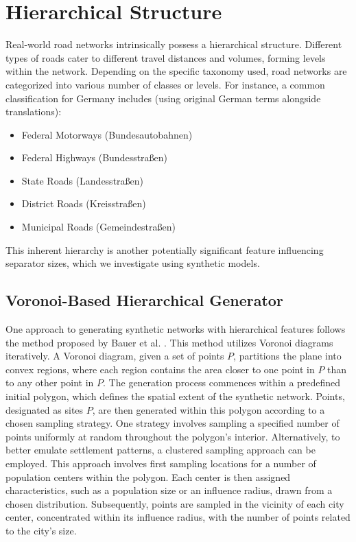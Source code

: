 










\section{Hierarchical Structure}

Real-world road networks intrinsically possess a hierarchical structure.
Different types of roads cater to different travel distances and volumes, forming levels within the network.
Depending on the specific taxonomy used, road networks are categorized into various number of classes or levels.
For instance, a common classification for Germany includes (using original German terms alongside translations):

\begin{itemize}
	\item Federal Motorways (Bundesautobahnen)
	\item Federal Highways (Bundesstraßen)
	\item State Roads (Landesstraßen)
	\item District Roads (Kreisstraßen)
	\item Municipal Roads (Gemeindestraßen)
\end{itemize}

This inherent hierarchy is another potentially significant feature influencing separator sizes, which we investigate using synthetic models.

\subsection{Voronoi-Based Hierarchical Generator}

One approach to generating synthetic networks with hierarchical features follows the method proposed by Bauer et al. \cite{hutchison_synthetic_2010}.
This method utilizes Voronoi diagrams iteratively.
A Voronoi diagram, given a set of points \(P\), partitions the plane into convex regions, where each region contains the area closer to one point in \(P\) than to any other point in \(P\).
The generation process commences within a predefined initial polygon, which defines the spatial extent of the synthetic network.
Points, designated as sites \(P\), are then generated within this polygon according to a chosen sampling strategy.
One strategy involves sampling a specified number of points uniformly at random throughout the polygon's interior.
Alternatively, to better emulate settlement patterns, a clustered sampling approach can be employed.
This approach involves first sampling locations for a number of population centers within the polygon.
Each center is then assigned characteristics, such as a population size or an influence radius, drawn from a chosen distribution.
Subsequently, points are sampled in the vicinity of each city center, concentrated within its influence radius, with the number of points related to the city's size.

